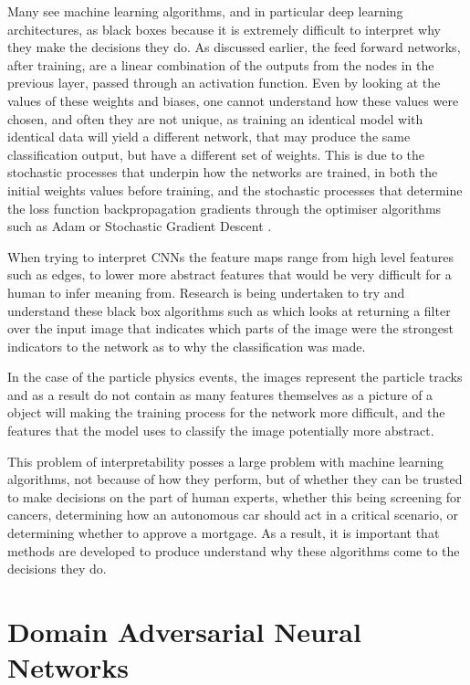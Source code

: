 \noindent Many see machine learning algorithms, and in particular deep learning architectures, as black boxes because it is extremely difficult to interpret why they make the decisions they do. As discussed earlier,  the feed forward networks, after training, are a linear combination of the outputs from the nodes in the previous layer, passed through an activation function. Even by looking at the values of these weights and biases, one cannot understand how these values were chosen, and often they are not unique, as training an identical model with identical data will yield a different network, that may produce the same classification output, but have a different set of weights. This is due to the stochastic processes that underpin how the networks are trained, in both the initial weights values before training, and the stochastic processes that determine the loss function backpropagation gradients through the optimiser algorithms such as Adam or Stochastic Gradient Descent \cite{Kingma} . \medskip

\noindent When trying to interpret CNNs the feature maps range from high level features such as edges, to lower more abstract features that would be very difficult for a human to infer meaning from. Research is being undertaken to try and understand these black box algorithms such as \cite{Zhang} which looks at returning a filter over the input image that indicates which parts of the image were the strongest indicators to the network as to why the classification was made. \medskip

\noindent In the case of the particle physics events, the images represent the particle tracks and as a result do not contain as many features themselves as a picture of a object will making the training process for the network more difficult, and the features that the model uses to classify the image potentially more abstract. \medskip

\noindent This problem of interpretability posses a large problem with machine learning algorithms, not because of how they perform, but of whether they can be trusted to make decisions on the part of human experts, whether this being screening for cancers, determining how an autonomous car should act in a critical scenario, or determining whether to approve a mortgage. As a result, it is important that methods are developed to produce understand why these algorithms come to the decisions they do. \medskip

\section{Domain Adversarial Neural Networks}

